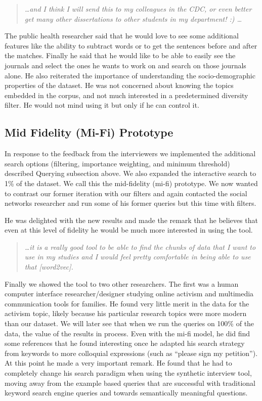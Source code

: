 \documentclass{sigchi}
\begin{document}
\begin{quote}
{\em
\dots and I think I will send this to my colleagues in the CDC, or even better get many other dissertations to other students in my department! :) \dots
}\end{quote}

The public health researcher said that he would love to see some additional features like the ability to subtract words or to get the sentences before and after the matches. Finally he said that he would like to be able to easily see the journals and select the ones he wants to work on and search on those journals alone. He also reiterated the importance of understanding the socio-demographic properties of the dataset. He was not concerned about knowing the topics embedded in the corpus, and not much interested in a predetermined diversity filter. He would not mind using it but only if he can control it.

\subsection{Mid Fidelity (Mi-Fi) Prototype}
In response to the feedback from the interviewers we implemented the additional search options (filtering, importance weighting, and minimum threshold) described Querying subsection above. We also expanded the interactive search to 1\% of the dataset. We call this the mid-fidelity (mi-fi) prototype. We now wanted to contrast our former iteration with our filters and again contacted the social networks researcher and run some of his former queries but this time with filters. 

He was delighted with the new results and made the remark that he believes that even at this level of fidelity he would be much more interested in using the tool.
\begin{quote}
{\em
\dots it is a really good tool to be able to find the chunks of data that I want to use in my studies and I would feel pretty comfortable in being able to use that [word2vec].}
\end{quote}

Finally we showed the tool to two other researchers. The first was a human computer interface researcher/designer studying online activism and multimedia communication tools for families. He found very little merit in the data for the activism topic, likely because his particular research topics were more modern than our dataset. We will later see that when we run the queries on 100\% of the data, the value of the results in process. Even with the mi-fi model, he did find some references that he found interesting once he adapted his search strategy from keywords to more colloquial expressions (such as ``please sign my petition''). At this point he made a very important remark. He found that he had to completely change his search paradigm when using the synthetic interview tool, moving away from the example based queries that are successful with traditional keyword search engine queries and towards semantically meaningful questions. 
\end{document}
